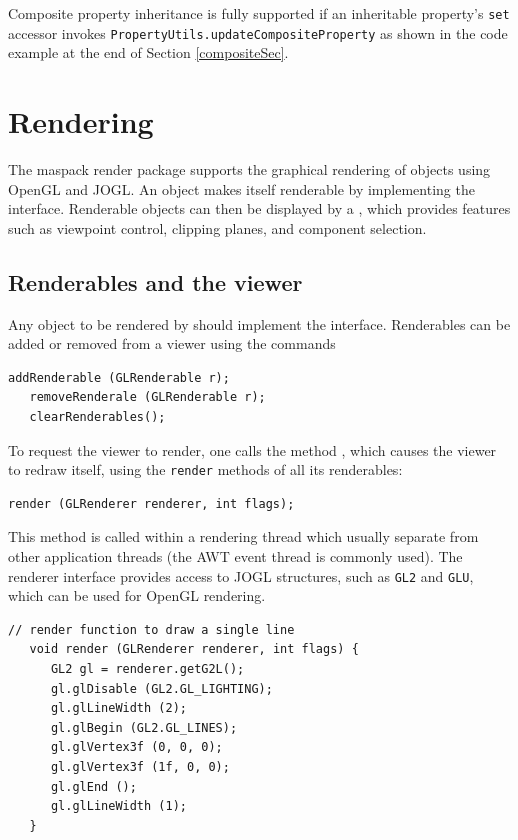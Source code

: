 \documentclass{article}
\begin{document}
Composite property inheritance is fully supported if an inheritable
property's {\tt set} accessor invokes 
{\tt PropertyUtils.update\-CompositeProperty} as shown in the code example at
the end of Section \ref{compositeSec}.

\section{Rendering}

The maspack render package supports the graphical rendering of objects
using OpenGL and JOGL. An object makes itself renderable by
implementing the  interface.  Renderable
objects can then be displayed by a , 
which provides features such as viewpoint control, clipping planes, and component
selection.

\subsection{Renderables and the viewer}

Any object to be rendered by  
should implement the  interface. 
Renderables can be added or removed from a
viewer using the commands
\begin{lstlisting}[]
   addRenderable (GLRenderable r);
   removeRenderale (GLRenderable r);
   clearRenderables();
\end{lstlisting}
To request the viewer to render, one calls the method
, 
which causes the viewer to redraw
itself, using the {\tt render} methods of all its renderables:
\begin{lstlisting}[]
   render (GLRenderer renderer, int flags);
\end{lstlisting}
This method is called within a rendering thread which usually separate
from other application threads (the AWT event thread is commonly
used). The renderer interface provides access to JOGL structures,
such as {\tt GL2} and {\tt GLU}, which can be used for OpenGL rendering.

\begin{lstlisting}[]
   // render function to draw a single line
   void render (GLRenderer renderer, int flags) {
      GL2 gl = renderer.getG2L();
      gl.glDisable (GL2.GL_LIGHTING);
      gl.glLineWidth (2);
      gl.glBegin (GL2.GL_LINES);
      gl.glVertex3f (0, 0, 0);
      gl.glVertex3f (1f, 0, 0);
      gl.glEnd ();
      gl.glLineWidth (1);
   }
\end{lstlisting}
\end{document}
